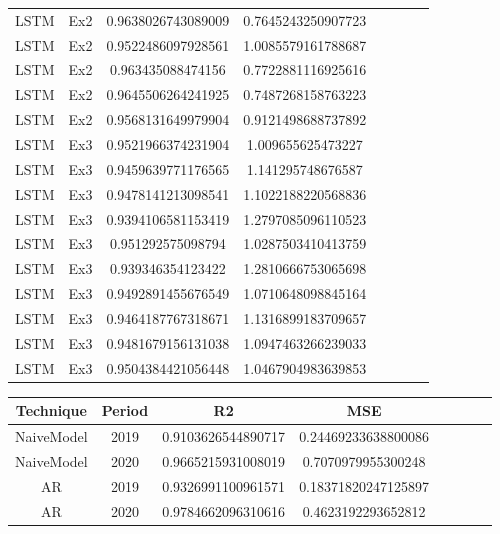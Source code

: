 \begin{appendices}
\begin{table}[H]
\begin{longtable}{ccccccll}
LSTM & Ex2 & 0.9638026743089009 & 0.7645243250907723 \\
LSTM & Ex2 & 0.9522486097928561 & 1.0085579161788687 \\
LSTM & Ex2 & 0.963435088474156 & 0.7722881116925616 \\
LSTM & Ex2 & 0.9645506264241925 & 0.7487268158763223 \\
LSTM & Ex2 & 0.9568131649979904 & 0.9121498688737892 \\
LSTM & Ex3 & 0.9521966374231904 & 1.009655625473227 \\
LSTM & Ex3 & 0.9459639771176565 & 1.141295748676587 \\
LSTM & Ex3 & 0.9478141213098541 & 1.1022188220568836 \\
LSTM & Ex3 & 0.9394106581153419 & 1.2797085096110523 \\
LSTM & Ex3 & 0.951292575098794 & 1.0287503410413759 \\
LSTM & Ex3 & 0.939346354123422 & 1.2810666753065698 \\
LSTM & Ex3 & 0.9492891455676549 & 1.0710648098845164 \\
LSTM & Ex3 & 0.9464187767318671 & 1.1316899183709657 \\
LSTM & Ex3 & 0.9481679156131038 & 1.0947463266239033 \\
LSTM & Ex3 & 0.9504384421056448 & 1.0467904983639853 \\ \hline
\end{longtable}
\end{table}


\thispagestyle{empty}


\begin{table}[H]
\scriptsize
\setlength\extrarowheight{3pt}
\centering
\caption{Resultados numéricos de todos os experimentos para os testes com os Modelos \textit{Naive} e AR. Ações PETR4.SA.}
\begin{longtable}{ccccccll}
\hline
Technique & Period & R2 & MSE \\ \hline
NaiveModel & 2019 & 0.9103626544890717 & 0.24469233638800086 \\
NaiveModel & 2020 & 0.9665215931008019 & 0.7070979955300248 \\
AR & 2019 & 0.9326991100961571 & 0.18371820247125897 \\
AR & 2020 & 0.9784662096310616 & 0.4623192293652812 \\ \hline
\end{longtable}
\end{table}

\end{appendices}